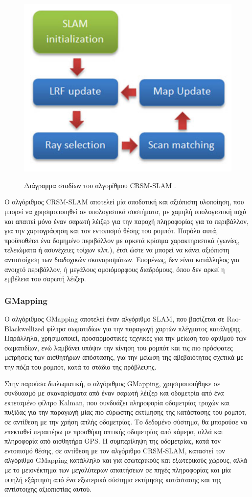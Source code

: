 \begin{figure}[!ht]
	\centering
	\includegraphics[width=0.4\linewidth]{Chapters/Chapter3/Figures/crsm_slam_diagram.png}
	\label{fig:crsm_slam_diagram.png}
	\caption[Διάγραμμα σταδίων του αλγορίθμου CRSM-SLAM.]{Διάγραμμα σταδίων του αλγορίθμου CRSM-SLAM \cite{crsm}.}
\end{figure}


\bigskip
Ο αλγόριθμος {CRSM-SLAM} αποτελεί μία αποδοτική και αξιόπιστη υλοποίηση, που μπορεί να χρησιμοποιηθεί σε υπολογιστικά συστήματα, με χαμηλή υπολογιστική ισχύ και απαιτεί μόνο έναν {σαρωτή λέιζερ} για την παροχή πληροφορίας για το περιβάλλον, για την χαρτογράφηση και τον εντοπισμό θέσης του ρομπότ. Παρόλα αυτά, προϋποθέτει ένα δομημένο περιβάλλον με αρκετά {κρίσιμα} χαρακτηριστικά (γωνίες, τελειώματα ή ασυνέχειες τοίχων κλπ.), έτσι ώστε να μπορεί να κάνει αξιόπιστη αντιστοίχιση των διαδοχικών σκαναρισμάτων. Επομένως, δεν είναι κατάλληλος για ανοιχτό περιβάλλον, ή μεγάλους ομοιόμορφους διαδρόμους, όπου δεν αρκεί η εμβέλεια του {σαρωτή λέιζερ}. 

\subsubsection{GMapping} \label{sssec:gmapping}
Ο αλγόριθμος {GMapping} αποτελεί έναν αλγόριθμο {SLAM}, που βασίζεται σε {Rao-Blackwellized φίλτρα σωματιδίων} για την παραγωγή {χαρτών πλέγματος κατάληψης}. Παράλληλα, χρησιμοποιεί, προσαρμοστικές τεχνικές για την μείωση του αριθμού των σωματιδίων, ενώ λαμβάνει υπόψιν την κίνηση του ρομπότ και τις πιο πρόσφατες μετρήσεις των αισθητήρων απόστασης, για την μείωση της αβεβαιότητας σχετικά με την πόζα του ρομπότ, κατά το στάδιο της πρόβλεψης.

\bigskip
Στην παρούσα διπλωματική, ο αλγόριθμος GMapping, χρησιμοποιήθηκε σε συνδυασμό με σκαναρίσματα από έναν σαρωτή λέιζερ και οδομετρία από ένα εκτεταμένο φίλτρο Kalman, που συνδυάζει πληροφορία οδομετρίας τροχών και πυξίδας για την παραγωγή μίας πιο εύρωστης εκτίμησης της κατάστασης του ρομπότ, σε αντίθεση με την χρήση απλής οδομετρίας. Το δεδομένο σύστημα, θα μπορούσε να επεκταθεί περαιτέρω με προσθήκη οπτικής οδομετρίας από κάμερα, αλλά και πληροφορία από αισθητήρα {GPS}. Η συμπερίληψη της οδομετρίας, κατά τον εντοπισμό θέσης, σε αντίθεση με τον αλγόριθμο {CRSM-SLAM}, καταστεί τον αλγόριθμο {GMapping} κατάλληλο και για εσωτερικούς και εξωτερικούς χώρους, αλλά με το μειονέκτημα των μεγαλύτερων απαιτήσεων σε πηγές πληροφορίας και μία υψηλή εξάρτηση από ένα εξωτερικό σύστημα εκτίμησης κατάστασης και της αντίστοιχης αξιοπιστίας αυτού. 

